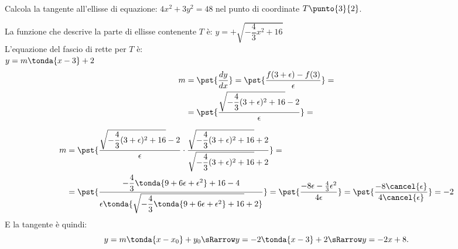 \begin{esempio}
{~}

\begin{minipage}{.44\textwidth}
Calcola la tangente all'ellisse di equazione:
\(4x^2+3y^2=48\)
nel punto di coordinate \(T\punto{3}{2}\).

La funzione che descrive la parte di ellisse 
contenente \(T\) è:
\(y=+\sqrt{-\dfrac{4}{3}x^2+16}\)\\
L'equazione del fascio di rette per \(T\) è:\\
\(y=m\tonda{x-3}+2\)
\begin{align*}
m&=\pst{\dfrac{d y}{d x}}=
   \pst{\dfrac{f(3+\epsilon)-f(3)}{\epsilon}}=\\
 &=\pst{\dfrac{\sqrt{-\dfrac{4}{3}(3+\epsilon)^2+16}-2}{\epsilon}}=
\end{align*}
\end{minipage}
\hfill
\begin{minipage}{.54\textwidth}
\begin{center}\iperellisse\end{center}
\end{minipage}
\begin{align*}
m&=\pst{\dfrac{\sqrt{-\dfrac{4}{3}(3+\epsilon)^2+16}-2}{\epsilon} \cdot
        \dfrac{\sqrt{-\dfrac{4}{3}(3+\epsilon)^2+16}+2}
              {\sqrt{-\dfrac{4}{3}(3+\epsilon)^2+16}+2}}=\\
 &=\pst{\dfrac{-\dfrac{4}{3}\tonda{9+6\epsilon+\epsilon^2}+16-4}
        {\epsilon
         \tonda{\sqrt{-\dfrac{4}{3}\tonda{9+6\epsilon+\epsilon^2}+16}+2}}}=
   \pst{\dfrac{-8\epsilon-\frac{4}{3}\epsilon^2}{4 \epsilon}}=
   \pst{\dfrac{-8 \cancel{\epsilon}}{4 \cancel{\epsilon}}}=-2
\end{align*}
E la tangente è quindi:
\[y=m \tonda{x-x_0}+y_0 \sRarrow y=-2 \tonda{x-3}+2 \sRarrow y=-2x+8.\]

\end{esempio}

